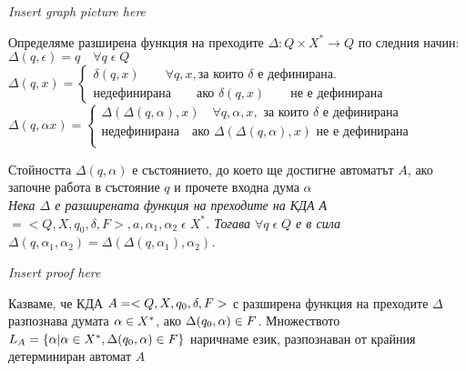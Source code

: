 \documentclass[11pt]{article} %
\begin{document}
\centerline{\emph{Insert graph picture here}}  
 Определяме разширена функция на преходите $\Delta : Q \times X^{*} \to Q$ по следния начин: \\
$\Delta(q, \epsilon) = q \quad \forall q \; \epsilon \; Q$ \\
$\Delta(q, x) = 
	\begin{cases}
		\delta(q, x) \quad \quad \forall q, x, \text{за които } \delta \text{ е дефинирана.}\\
		\text{недефинирана}\quad \quad \text{ако } \delta(q, x) \quad \quad \text{не е дефинирана}   
    \end{cases}$\\
$\Delta(q, \alpha x) = 
	\begin{cases}
		\Delta(\Delta(q, \alpha), x) \quad \forall q, \alpha, x, \text{ за които } \delta \text{ е дефинирана} \\
		\text{недефинирана} \quad \text{ако } \Delta(\Delta(q, \alpha), x) \text{ не е дефинирана} \\   
	\end{cases}$ \par

Стойността $\Delta(q, \alpha)$ е състоянието, до което ще достигне автоматът $A$, ако започне работа в състояние $q$ и прочете входна дума $\alpha$\\

 \emph{Нека $\Delta$ е разширената функция на преходите на КДА А 
$ = < Q, X, q_{0}, \delta, F >, a, \alpha_{1}, \alpha_{2} \; \epsilon \; X^{*}$. Тогава $\forall q \; \epsilon \; Q$ е в сила 
$\Delta(q, \alpha_{1}, \alpha_{2}) = \Delta(\Delta(q, \alpha_{1}), \alpha_{2})$.} \\

\centerline{\emph{Insert proof here}}

 Казваме, че КДА 
$A = <Q, X, q_{0}, \delta, F> $ с разширена функция на преходите 
$\Delta$ разпознава думата 
$\alpha \in X^{*}$, ако $\Delta(q_{0}, \alpha) \in F$. Множеството 
$L_{A} = \{\alpha| \alpha \in X^{*}, \Delta(q_{0}, \alpha) \in F\}$ наричнаме език, разпознаван от крайния детерминиран автомат $A$ \par
\end{document}
